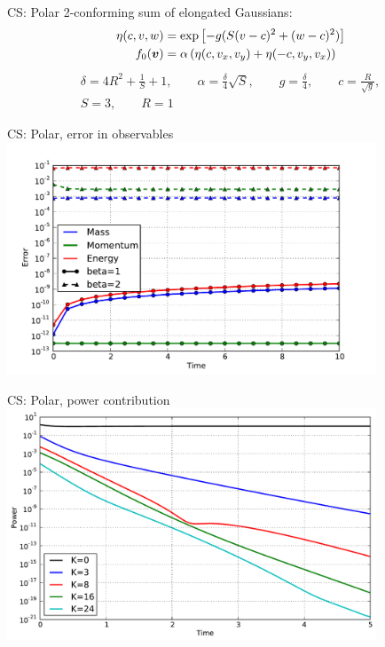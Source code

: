 \documentclass[hyperref={bookmarksopen, colorlinks, linkcolor=blue, urlcolor=green, citecolor=red}, color={usenames,dvipsnames}]{beamer}
\begin{document}
\begin{frame}{CS: Polar}
2-conforming sum of elongated Gaussians:
\begin{align*}
    \eta(c,v,w) &= \exp\left[-g(S(v-c)^2 + (w-c)^2)\right] \\
    f_0({\bm v}) &= \alpha\left( \eta(c,v_x,v_y) + \eta(-c,v_y,v_x) \right)
\end{align*}
\begin{gather*}
    \delta = 4R^2+\frac{1}{S}+1, \qquad
    \alpha = \frac{\delta}{4}\sqrt{S}, \qquad
    g = \frac{\delta}{4}, \qquad
    c = \frac{R}{\sqrt{g}}, \\
    S=3, \qquad R=1
\end{gather*}
\end{frame}

\begin{frame}{CS: Polar, error in observables}
\centering
\includegraphics[width=11cm]{../figs/polboltz/scrossed-obs}
\end{frame}

\begin{frame}{CS: Polar, power contribution}
\centering
\includegraphics[width=11cm]{../figs/polboltz/power}
\end{frame}
\end{document}
